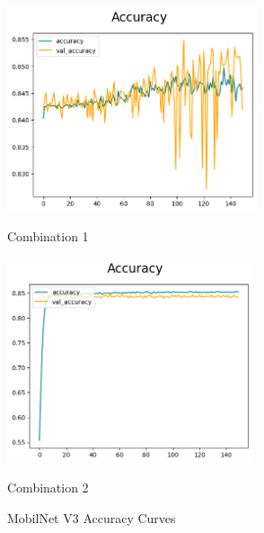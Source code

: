 \begin{figure}[H]
    \centering
    \begin{minipage}[b]{0.49\textwidth}
        \centering
        \includegraphics[width=\textwidth, height=6cm]{Figures/unbalanced_data/without bn/mn3/accuracy.png}
        \captionsetup{labelformat=empty}
        \caption{Combination 1}
        \label{fig:u_wo_r_a}
    \end{minipage}
    \hfill
    \begin{minipage}[b]{0.49\textwidth}
        \centering
        \includegraphics[width=\textwidth, height=6cm]{Figures/unbalanced_data/with bn/mn3/accuracy.png}
        \captionsetup{labelformat=empty}
        \caption{Combination 2}
        \label{fig:u_w_r_a}
    \end{minipage}
    \captionsetup{labelformat=default}
    \caption{MobilNet V3 Accuracy Curves}
\end{figure}


